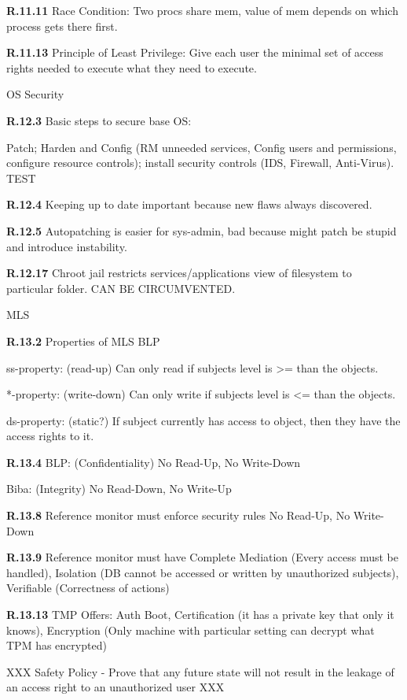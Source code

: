 \documentclass[8pt]{extreport}
\begin{document}
{\bf R.11.11}
Race Condition: Two procs share mem, value of mem depends on which process gets
there first.

{\bf R.11.13}
Principle of Least Privilege: Give each user the minimal set of access rights
needed to execute what they need to execute.


{OS Security}

{\bf R.12.3}
Basic steps to secure base OS:

Patch; Harden and Config (RM unneeded services, Config users and permissions,
configure resource controls); install security controls (IDS, Firewall,
Anti-Virus). TEST


{\bf R.12.4}
Keeping up to date important because new flaws always discovered.

{\bf R.12.5}
Autopatching is easier for sys-admin, bad because might patch be stupid and
introduce instability.




{\bf R.12.17}
Chroot jail restricts services/applications view of filesystem to particular
folder. CAN BE CIRCUMVENTED.

{\Huge MLS}

{\bf R.13.2}
Properties of MLS BLP

ss-property: (read-up) Can only read if subjects level is >= than the objects.

*-property: (write-down) Can only write if subjects level is <= than the objects.

ds-property: (static?) If subject currently has access to object, then they have the
access rights to it.

{\bf R.13.4}
BLP: (Confidentiality) No Read-Up, No Write-Down

Biba: (Integrity) No Read-Down, No Write-Up

{\bf R.13.8}
Reference monitor must enforce security rules No Read-Up, No Write-Down

{\bf R.13.9}
Reference monitor must have Complete Mediation (Every access must be handled), Isolation (DB cannot be accessed or
written by unauthorized subjects), Verifiable (Correctness of actions)

{\bf R.13.13}
TMP Offers: Auth Boot, Certification (it has a private key that only it knows),
Encryption (Only machine with particular setting can decrypt what TPM has
encrypted)


XXX Safety Policy - Prove that any future state will not result in the leakage
of an access right to an unauthorized user XXX
\end{document}
